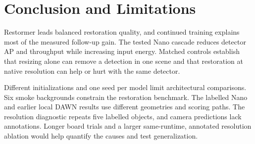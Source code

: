 \section{Conclusion and Limitations}
Restormer leads balanced restoration quality, and continued training explains most of the measured follow-up gain. The tested Nano cascade reduces detector AP and throughput while increasing input energy. Matched controls establish that resizing alone can remove a detection in one scene and that restoration at native resolution can help or hurt with the same detector.

Different initializations and one seed per model limit architectural comparisons. Six smoke backgrounds constrain the restoration benchmark. The labelled Nano and earlier local DAWN results use different geometries and scoring paths. The resolution diagnostic repeats five labelled objects, and camera predictions lack annotations. Longer board trials and a larger same-runtime, annotated resolution ablation would help quantify the causes and test generalization.
